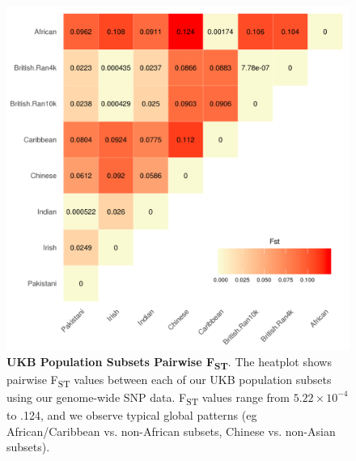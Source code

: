 \documentclass[12pt,a4paper]{article}
\begin{document}
\begin{figure}[htb]
\centering
\includegraphics[scale=.5]{Images/Main/InterPath_Main_Figure_Fst_vs1.png}
\caption[TBD]{\textbf{UKB Population Subsets Pairwise F\textsubscript{ST}}. The heatplot shows pairwise F\textsubscript{ST} values between each of our UKB population subsets using our genome-wide SNP data. F\textsubscript{ST} values range from $5.22\times10^{-4}$ to .124, and we observe typical global patterns (eg African/Caribbean vs. non-African subsets, Chinese vs. non-Asian subsets).}
\label{InterPath-Main-Figure-Fst}
\end{figure}
\end{document}

